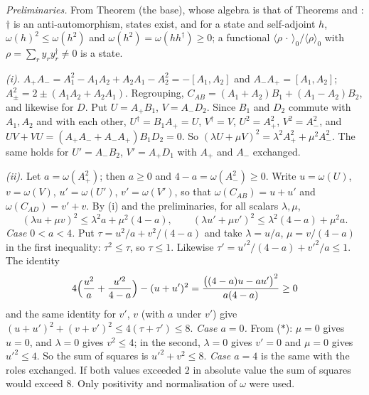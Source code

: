 \emph{Preliminaries.} From Theorem  (the base), whose algebra is that of Theorems  and : $\dagger$ is an anti-automorphism, states exist, and for a state and self-adjoint $h$, $\omega(h)^{2} \le \omega(h^{2})$ and $\omega(h^{2}) = \omega(hh^{\dagger}) \ge 0$; a functional $\langle\rho\,\cdot\,\rangle_{0}/\langle\rho\rangle_{0}$ with $\rho = \sum_{r}y_{r}y_{r}^{\dagger} \ne 0$ is a state.

\emph{(i).} $A_{+}A_{-} = A_{1}^{2} - A_{1}A_{2} + A_{2}A_{1} - A_{2}^{2} = -[A_{1},A_{2}]$ and $A_{-}A_{+} = [A_{1},A_{2}]$; $A_{\pm}^{2} = 2 \pm (A_{1}A_{2} + A_{2}A_{1})$. Regrouping, $C_{AB} = (A_{1} + A_{2})B_{1} + (A_{1} - A_{2})B_{2}$, and likewise for $D$. Put $U = A_{+}B_{1}$, $V = A_{-}D_{2}$. Since $B_{1}$ and $D_{2}$ commute with $A_{1}, A_{2}$ and with each other, $U^{\dagger} = B_{1}A_{+} = U$, $V^{\dagger} = V$, $U^{2} = A_{+}^{2}$, $V^{2} = A_{-}^{2}$, and $UV + VU = (A_{+}A_{-} + A_{-}A_{+})B_{1}D_{2} = 0$. So $(\lambda U + \mu V)^{2} = \lambda^{2}A_{+}^{2} + \mu^{2}A_{-}^{2}$. The same holds for $U' = A_{-}B_{2}$, $V' = A_{+}D_{1}$ with $A_{+}$ and $A_{-}$ exchanged.

\emph{(ii).} Let $a = \omega(A_{+}^{2})$; then $a \ge 0$ and $4 - a = \omega(A_{-}^{2}) \ge 0$. Write $u = \omega(U)$, $v = \omega(V)$, $u' = \omega(U')$, $v' = \omega(V')$, so that $\omega(C_{AB}) = u + u'$ and $\omega(C_{AD}) = v' + v$. By (i) and the preliminaries, for all scalars $\lambda, \mu$,
\[
(\lambda u + \mu v)^{2} \le \lambda^{2}a + \mu^{2}(4 - a), \qquad (\lambda u' + \mu v')^{2} \le \lambda^{2}(4 - a) + \mu^{2}a . \tag{$*$}
\]
\emph{Case $0 < a < 4$.} Put $\tau = u^{2}/a + v^{2}/(4 - a)$ and take $\lambda = u/a$, $\mu = v/(4 - a)$ in the first inequality: $\tau^{2} \le \tau$, so $\tau \le 1$. Likewise $\tau' = u'^{2}/(4 - a) + v'^{2}/a \le 1$. The identity
\[
4\Bigl(\frac{u^{2}}{a} + \frac{u'^{2}}{4 - a}\Bigr) - (u + u')^{2} = \frac{\bigl((4 - a)u - au'\bigr)^{2}}{a(4 - a)} \ge 0
\]
and the same identity for $v'$, $v$ (with $a$ under $v'$) give $(u + u')^{2} + (v + v')^{2} \le 4(\tau + \tau') \le 8$. \emph{Case $a = 0$.} From ($*$): $\mu = 0$ gives $u = 0$, and $\lambda = 0$ gives $v^{2} \le 4$; in the second, $\lambda = 0$ gives $v' = 0$ and $\mu = 0$ gives $u'^{2} \le 4$. So the sum of squares is $u'^{2} + v^{2} \le 8$. \emph{Case $a = 4$} is the same with the roles exchanged. If both values exceeded $2$ in absolute value the sum of squares would exceed $8$. Only positivity and normalisation of $\omega$ were used.

